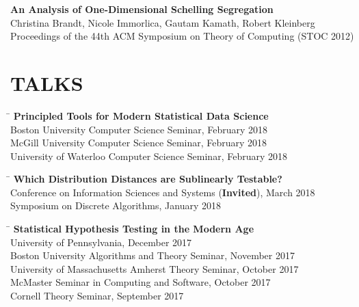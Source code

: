 \documentclass{res}
\begin{document}
\begin{resume}
      {\bf An Analysis of One-Dimensional Schelling Segregation}  \\
      Christina Brandt, Nicole Immorlica, Gautam Kamath, Robert Kleinberg  \\
      Proceedings of the 44th ACM Symposium on Theory of Computing (STOC 2012)

\section{TALKS}
    \vspace{-0.1in}
    \begin{tabbing}
    \hspace{0.3in}\= \kill 
    {\bf Principled Tools for Modern Statistical Data Science}\\
    \> Boston University Computer Science Seminar, February 2018 \\
    \> McGill University Computer Science Seminar, February 2018 \\
    \> University of Waterloo Computer Science Seminar, February 2018 
    \end{tabbing}
    \vspace{-20pt}
    \begin{tabbing}
    \hspace{0.3in}\= \kill 
    {\bf Which Distribution Distances are Sublinearly Testable?} \\
    \> Conference on Information Sciences and Systems ({\bf Invited}), March 2018 \\
    \> Symposium on Discrete Algorithms, January 2018
    \end{tabbing}
    \vspace{-20pt}
    \begin{tabbing}
    \hspace{0.3in}\= \kill 
    {\bf Statistical Hypothesis Testing in the Modern Age} \\
    \> University of Pennsylvania, December 2017 \\
    \> Boston University Algorithms and Theory Seminar, November 2017 \\
    \> University of Massachusetts Amherst Theory Seminar, October 2017 \\
    \> McMaster Seminar in Computing and Software, October 2017 \\
    \> Cornell Theory Seminar, September 2017 
    \end{tabbing}
    \vspace{-20pt}
    \begin{tabbing}

\end{tabbing}
\end{resume}
\end{document}
